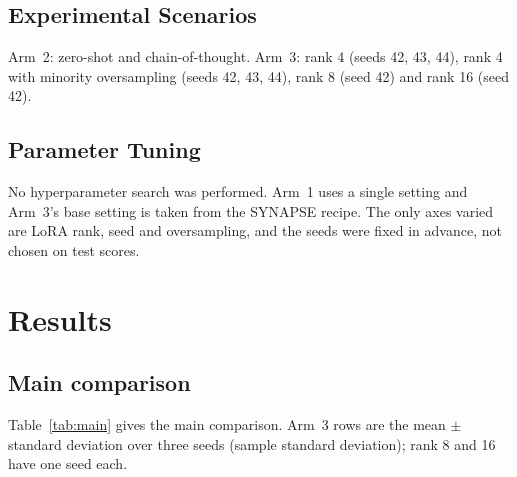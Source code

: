 \subsection{Experimental Scenarios}

Arm~2: zero-shot and chain-of-thought. Arm~3: rank 4 (seeds 42, 43, 44), rank 4 with minority oversampling (seeds 42, 43, 44), rank 8 (seed 42) and rank 16 (seed 42).

\subsection{Parameter Tuning}

No hyperparameter search was performed. Arm~1 uses a single setting and Arm~3's base setting is taken from the SYNAPSE recipe. The only axes varied are LoRA rank, seed and oversampling, and the seeds were fixed in advance, not chosen on test scores.

\section{Results}

\subsection{Main comparison}

Table~\ref{tab:main} gives the main comparison. Arm~3 rows are the mean $\pm$ standard deviation over three seeds (sample standard deviation); rank 8 and 16 have one seed each.

